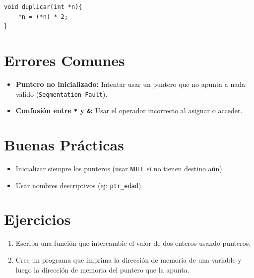 \documentclass[12pt,a4paper]{article}
\begin{document}
\begin{lstlisting}
void duplicar(int *n){
    *n = (*n) * 2;
}
\end{lstlisting}

\section{Errores Comunes}
\begin{itemize}
    \item \textbf{Puntero no inicializado:} Intentar usar un puntero que no apunta a nada válido (\texttt{Segmentation Fault}).
    \item \textbf{Confusión entre \texttt{*} y \texttt{\&}:} Usar el operador incorrecto al asignar o acceder.
\end{itemize}

\section{Buenas Prácticas}
\begin{itemize}
    \item Inicializar siempre los punteros (usar \texttt{NULL} si no tienen destino aún).
    \item Usar nombres descriptivos (ej: \texttt{ptr\_edad}).
\end{itemize}

\section{Ejercicios}
\begin{enumerate}
    \item Escriba una función que intercambie el valor de dos enteros usando punteros.
    \item Cree un programa que imprima la dirección de memoria de una variable y luego la dirección de memoria del puntero que la apunta.
\end{enumerate}
\end{document}
